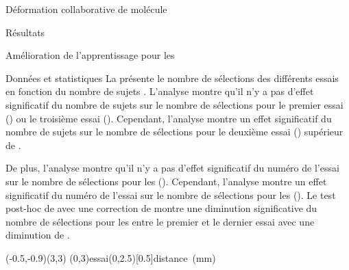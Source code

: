 \documentclass[myfrancais,ngerman,english,french]{mythesis}
\begin{document}
\begin{mychapter}{Déformation collaborative de molécule}
\begin{mysection}{Résultats}
\begin{mysubsection}{Amélioration de l'apprentissage pour les }
\begin{mysubsubsection}{Données et statistiques}
					La  présente le nombre de sélections  des différents essais  en fonction du nombre de sujets .
					L'analyse montre qu'il n'y a pas d'effet significatif du nombre de sujets  sur le nombre de sélections  pour le premier essai () ou le troisième essai ().
					Cependant, l'analyse montre un effet significatif du nombre de sujets  sur le nombre de sélections  pour le deuxième essai () supérieur de .

					De plus, l'analyse montre qu'il n'y a pas d'effet significatif du numéro de l'essai  sur le nombre de sélections  pour les  ().
					Cependant, l'analyse montre un effet significatif du numéro de l'essai  sur le nombre de sélections  pour les  ().
					Le test post-hoc de  avec une correction de  montre une diminution significative du nombre de sélections pour les  entre le premier et le dernier essai avec une diminution de .

					\begin{myfigure}
						\begin{myps}(-0.5,-0.9)(3,3)
							\myaxes(0,3){essai}(0,2.5)[0.5]{distance~(mm)}
						\end{myps}
					\end{myfigure}


\end{mysubsubsection}
\end{mysubsection}
\end{mysection}
\end{mychapter}
\end{document}
